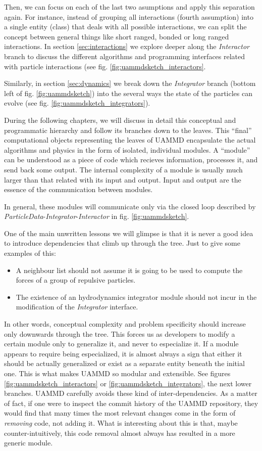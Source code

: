 \documentclass[ twoside,openright,titlepage,numbers=noenddot,%
headinclude,footinclude,cleardoublepage=empty,abstract=on,
BCOR=5mm,paper=a4,fontsize=11pt, dvipsnames
]{scrreprt}
\newcommand{\uammd}{\gls{UAMMD}\xspace}
\begin{document}
Then, we can focus on each of the last two asumptions and apply this separation again. For instance, instead of grouping all interactions (fourth assumption) into a single entity (class) that deals with all possible interactions, we can split the concept between general things like short ranged, bonded or long ranged interactions. In section \ref{sec:interactions} we explore deeper along the \emph{Interactor} branch to discuss the different algorithms and programming interfaces related with particle interactions (see fig. \ref{fig:uammdsketch_interactors}.

Similarly, in section \ref{sec:dynamics} we break down the \emph{Integrator} branch (bottom left of fig. \ref{fig:uammdsketch}) into the several ways the state of the particles can evolve (see fig. \ref{fig:uammdsketch_integrators}).

During the following chapters, we will discuss in detail this conceptual and programmatic hierarchy and follow its branches down to the leaves. This ``final'' computational objects representing the leaves of \uammd encapsulate the actual algorithms and physics in the form of isolated, individual modules. A ``module'' can be understood as a piece of code which recieves information, processes it, and send back some output. The internal complexity of a module is usually much larger than that related with its input and output. Input and output are the essence of the communication between modules.

In general, these modules will communicate only via the closed loop described by \emph{ParticleData}-\emph{Integrator}-\emph{Interactor} in fig. \ref{fig:uammdsketch}.

One of the main unwritten lessons we will glimpse is that it is never a good idea to introduce dependencies that climb up through the tree. Just to give some examples of this:
\begin{itemize}
\item A neighbour list should not assume it is going to be used to
  compute the forces of a group of repulsive particles.
\item The existence
  of an hydrodynamics integrator module should not incur in the
  modification of the \emph{Integrator} interface.
\end{itemize}
In other words, conceptual complexity and problem specificity should increase only downwards through the tree. This forces us as developers to modify a certain module only to generalize it, and never to especialize it. If a module appears to require being especialized, it is almost always a sign that either it should be actually generalized or exist as a separate entity beneath the initial one. This is what makes \uammd so modular and extensible. See figures \ref{fig:uammdsketch_interactors} or \ref{fig:uammdsketch_integrators}, the next lower branches.
\uammd carefully avoids these kind of inter-dependencies. As a matter of fact, if one were to inspect the commit history of the \uammd repository, they would find that many times the most relevant changes come in the form of \emph{removing} code, not adding it. What is interesting about this is that, maybe counter-intuitively, this code removal almost always has resulted in a more generic module.
\end{document}
